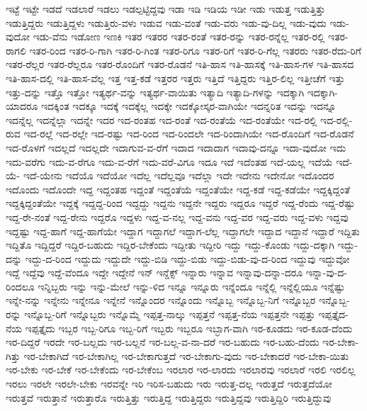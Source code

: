 {ಇಟ್ಟೆ
ಇಟ್ಟೇ
ಇಡದೆ
ಇಡಲಾರೆ
ಇಡಲು
ಇಡಲ್ಪಟ್ಟಿದ್ದವು
ಇಡಾ
ಇಡಿ
ಇಡಿಯ
ಇಡೀ
ಇಡು
ಇಡುತ್ತ
ಇಡುತ್ತಿತ್ತು
ಇಡುತ್ತಿದ್ದರು
ಇಡುತ್ತಿದ್ದಳು
ಇಡುತ್ತಿರು-ವಳು
ಇಡುವ
ಇಡು-ವಂತೆ
ಇಡು-ವರು
ಇಡು-ವು-ದಿಲ್ಲ
ಇಡು-ವುದು
ಇಡು-ವುದೋ
ಇಡು-ವೆನು
ಇಡೋಣ
ಇಣಕಿ
ಇತರ
ಇತರರ
ಇತರ-ರಂತೆ
ಇತರ-ರನ್ನು
ಇತರ-ರನ್ನೆಲ್ಲ
ಇತರ-ರಲ್ಲಿ
ಇತರ-ರಾಗಲಿ
ಇತರ-ರಿಂದ
ಇತರ-ರಿ-ಗಾಗಿ
ಇತರ-ರಿ-ಗಿಂತ
ಇತರ-ರಿಗೂ
ಇತರ-ರಿಗೆ
ಇತರ-ರಿ-ಗೆಲ್ಲ
ಇತರರು
ಇತರ-ರೆದು-ರಿಗೆ
ಇತರ-ರೆಲ್ಲರ
ಇತರ-ರೆಲ್ಲರೂ
ಇತರ-ರೊಂದಿಗೆ
ಇತರ-ರೊಡನೆ
ಇತಿ-ಹಾಸ
ಇತಿ-ಹಾಸಕ್ಕೆ
ಇತಿ-ಹಾಸ-ಗಳ
ಇತಿ-ಹಾಸದ
ಇತಿ-ಹಾಸ-ದಲ್ಲಿ
ಇತಿ-ಹಾಸ-ವೆಲ್ಲ
ಇತ್ತ
ಇತ್ತ-ಕಡೆ
ಇತ್ತರರ
ಇತ್ತರು
ಇತ್ತಿದೆ
ಇತ್ತಿದ್ದರು
ಇತ್ತಿರ-ಲಿಲ್ಲ
ಇತ್ತೀಚೆಗೆ
ಇತ್ತು
ಇತ್ತು-ದನ್ನು
ಇತ್ತೊ
ಇತ್ತೋ
ಇತ್ಯರ್ಥ-ವನ್ನು
ಇತ್ಯರ್ಥ-ವಾಯಿತು
ಇತ್ಯಾದಿ
ಇತ್ಯಾದಿ-ಗಳನ್ನು
ಇದಕ್ಕಾಗಿ
ಇದಕ್ಕಾಗಿ-ಯಾದರೂ
ಇದಕ್ಕಿಂತ
ಇದಕ್ಕೂ
ಇದಕ್ಕೆ
ಇದಕ್ಕೆಲ್ಲ
ಇದಕ್ಕೇ
ಇದಕ್ಕೋಸ್ಕರ-ವಾಗಿಯೇ
ಇದನ್ನರಿತ
ಇದನ್ನು
ಇದನ್ನೂ
ಇದನ್ನೆಲ್ಲ
ಇದನ್ನೆಲ್ಲಾ
ಇದನ್ನೇ
ಇದರ
ಇದ-ರಂತಹ
ಇದ-ರಂತೆ
ಇದ-ರಂತೆಯೆ
ಇದ-ರಂತೆಯೇ
ಇದ-ರಲ್ಲಿ
ಇದ-ರಲ್ಲಿ-ರುವ
ಇದ-ರಲ್ಲೆ
ಇದ-ರಲ್ಲೇ
ಇದ-ರಷ್ಟು
ಇದ-ರಿಂದ
ಇದ-ರಿಂದಲೇ
ಇದ-ರಿಂದಾಗಿಯೇ
ಇದ-ರೊಂದಿಗೆ
ಇದ-ರೊಡನೆ
ಇದ-ರೊಳಗೆ
ಇದಲ್ಲದೆ
ಇದಲ್ಲದೇ
ಇದಾಗುವ-ವ-ರೆಗೆ
ಇದಾದ
ಇದಾದಾಗ
ಇದಾವು-ದನ್ನೂ
ಇದಾ-ವುದೋ
ಇದು
ಇದು-ವರೆಗು
ಇದು-ವ-ರೆಗೂ
ಇದು-ವ-ರೆಗೆ
ಇದು-ವರೆ-ವಿಗೂ
ಇದೂ
ಇದೆ
ಇದೆಂತಹ
ಇದೆ-ಯಲ್ಲ
ಇದೆಯೆ
ಇದೆ-ಯೆ-
ಇದೆ-ಯೇನು
ಇದೆಯೊ
ಇದೆಯೋ
ಇದೆಲ್ಲ
ಇದೆಲ್ಲವೂ
ಇದೆಲ್ಲಾ
ಇದೇ
ಇದೇನು
ಇದೇನೋ
ಇದೊಂದರ
ಇದೊಂದು
ಇದೊಂದೇ
ಇದ್ದ
ಇದ್ದಂತಹ
ಇದ್ದಂತೆ
ಇದ್ದಂತೆಯೆ
ಇದ್ದಂತೆಯೇ
ಇದ್ದ-ಕಡೆ
ಇದ್ದ-ಕಡೆಯೇ
ಇದ್ದಕ್ಕಿದ್ದಂತೆ
ಇದ್ದಕ್ಕಿದ್ದಂತೆಯೇ
ಇದ್ದಕ್ಕೆ
ಇದ್ದದ್ದ-ರಿಂದ
ಇದ್ದದ್ದು
ಇದ್ದನು
ಇದ್ದನೇ
ಇದ್ದರು
ಇದ್ದರೂ
ಇದ್ದರೆ
ಇದ್ದ-ರೆಂದು
ಇದ್ದ-ರೆಷ್ಟು
ಇದ್ದ-ರೇ-ನಂತೆ
ಇದ್ದ-ರೇನು
ಇದ್ದರೊ
ಇದ್ದಳು
ಇದ್ದ-ವ-ನಲ್ಲ
ಇದ್ದ-ವನು
ಇದ್ದ-ವರ
ಇದ್ದ-ವರು
ಇದ್ದ-ವಳು
ಇದ್ದವು
ಇದ್ದಷ್ಟು
ಇದ್ದ-ಹಾಗೆ
ಇದ್ದ-ಹಾಗೆಯೇ
ಇದ್ದಾಗ
ಇದ್ದಾಗಲೆ
ಇದ್ದಾಗ-ಲೆಲ್ಲ
ಇದ್ದಾಗಲೇ
ಇದ್ದಾದ
ಇದ್ದಾನೆ
ಇದ್ದಾರೆ
ಇದ್ದಿತು
ಇದ್ದಿತೊ
ಇದ್ದಿದ್ದರೆ
ಇದ್ದಿರ-ಬಹುದು
ಇದ್ದಿರ-ಬೇಕೆಂದು
ಇದ್ದೀತು
ಇದ್ದೀರಿ
ಇದ್ದು
ಇದ್ದು-ಕೊಂಡು
ಇದ್ದು-ದಕ್ಕಾಗಿ
ಇದ್ದು-ದನ್ನು
ಇದ್ದು-ದ-ರಿಂದ
ಇದ್ದುದು
ಇದ್ದುದೇ
ಇದ್ದು-ಬಿಡಿ
ಇದ್ದು-ಬಿಡು
ಇದ್ದು-ಬಿಡು-ವು-ದ-ರಿಂದ
ಇದ್ದುವು
ಇದ್ದುವೋ
ಇದ್ದೆ
ಇದ್ದೆವು
ಇದ್ದೆ-ವೆಂದೂ
ಇದ್ದೇ
ಇದ್ದೇನೆ
ಇನ್
ಇನ್ಡೆಕ್ಸ್
ಇನ್ನಾರು
ಇನ್ನಾವ
ಇನ್ನಾವು-ದನ್ನಾ-ದರೂ
ಇನ್ನಾ-ವು-ದ-ರಿಂದಲೂ
ಇನ್ನಿಬ್ಬರು
ಇನ್ನು
ಇನ್ನು-ಮೇಲೆ
ಇನ್ನು-ಳಿದ
ಇನ್ನೂ
ಇನ್ನೂರು
ಇನ್ನೆಂದೂ
ಇನ್ನೆಲ್ಲಿ
ಇನ್ನೆಲ್ಲಿಯೂ
ಇನ್ನೆಷ್ಟು
ಇನ್ನೇ-ನನ್ನು
ಇನ್ನೇನು
ಇನ್ನೇನೂ
ಇನ್ನೇನೆ
ಇನ್ನೊಂದರ
ಇನ್ನೊಂದು
ಇನ್ನೊಬ್ಬ
ಇನ್ನೊಬ್ಬ-ನಿಗೆ
ಇನ್ನೊಬ್ಬರ
ಇನ್ನೊಬ್ಬ-ರನ್ನು
ಇನ್ನೊಬ್ಬ-ರಿಗೆ
ಇನ್ನೊಬ್ಬರು
ಇನ್ನೊಮ್ಮೆ
ಇಪ್ಪತ್ತ-ನಾಲ್ಕು
ಇಪ್ಪತ್ತನೆ
ಇಪ್ಪತ್ತ-ನೆಯ
ಇಪ್ಪತ್ತನೇ
ಇಪ್ಪತ್ತು
ಇಪ್ಪತ್ತೈದ-ನೆಯ
ಇಪ್ಪತ್ತೈದು
ಇಬ್ಬರ
ಇಬ್ಬ-ರಿಗೂ
ಇಬ್ಬ-ರಿಗೆ
ಇಬ್ಬರು
ಇಬ್ಬರೂ
ಇಬ್ಭಾಗ-ವಾಗಿ
ಇರ-ಕೂಡದು
ಇರ-ಕೂಡ-ದೆಂದು
ಇರ-ದಿದ್ದರೆ
ಇರದೇ
ಇರ-ಬಲ್ಲದು
ಇರ-ಬಲ್ಲನೆ
ಇರ-ಬಲ್ಲ-ವ-ನಾ-ದರೆ
ಇರ-ಬಹುದು
ಇರ-ಬಹು-ದೆಂದು
ಇರ-ಬೇಕಾ-ಗಿತ್ತು
ಇರ-ಬೇಕಾಗಿದೆ
ಇರ-ಬೇಕಾಗಿಲ್ಲ
ಇರ-ಬೇಕಾಗುತ್ತದೆ
ಇರ-ಬೇಕಾಗು-ವುದು
ಇರ-ಬೇಕಾದರೆ
ಇರ-ಬೇಕಾ-ಯಿತು
ಇರ-ಬೇಕು
ಇರ-ಬೇಕೆ
ಇರ-ಬೇಕೆಂದು
ಇರ-ಬೇಕೆಂಬ
ಇರಲಾರ
ಇರ-ಲಾರದು
ಇರಲಾರವು
ಇರಲಾರೆ
ಇರಲಿ
ಇರಲಿಲ್ಲ
ಇರಲು
ಇರಲೇ
ಇರಲೇ-ಬೇಕು
ಇರವನ್ನೇ
ಇರಿ
ಇರಿಸ-ಬಹುದು
ಇರು
ಇರುತ್ತ-ದಲ್ಲ
ಇರುತ್ತದೆ
ಇರುತ್ತದೆಯೋ
ಇರುತ್ತವೆ
ಇರುತ್ತಾನೆ
ಇರುತ್ತಾರೊ
ಇರುತ್ತಿತ್ತು
ಇರುತ್ತಿದ್ದ
ಇರುತ್ತಿದ್ದರು
ಇರುತ್ತಿದ್ದವು
ಇರುತ್ತಿದ್ದಿರಿ
ಇರುತ್ತಿದ್ದುವು
}
